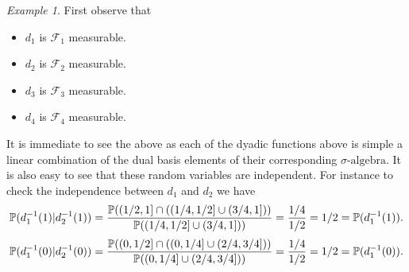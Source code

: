 \documentclass[11pt,a4paper]{article}
\theoremstyle{definition}
\theoremstyle{remark}
\newtheorem{example}{Example}
\begin{document}
\begin{example}
		First observe that
		\begin{itemize}[noitemsep]
			\item $ d_1 $ is $ \mathcal{F}_1 $ measurable.
			\item $ d_2 $ is $ \mathcal{F}_2 $ measurable.
			\item $ d_3 $ is $ \mathcal{F}_3 $ measurable.
			\item $ d_4 $ is $ \mathcal{F}_4 $ measurable.
		\end{itemize}
		It is immediate to see the above as each of the dyadic functions above is simple a linear combination of the dual basis elements of their corresponding $\sigma\text{-algebra}$. It is also easy to see that these random variables are independent. For instance to check the independence between $ d_1 $ and $ d_2 $ we have
		\[ \mathbb{P}(d_1^{-1}(1)|d_2^{-1}(1)) = \frac{\mathbb{P}((1/2,1] \cap ((1/4,1/2]\cup(3/4,1]))}{\mathbb{P}((1/4,1/2]\cup(3/4,1]))} = \frac{1/4}{1/2} = 1/2 =  \mathbb{P}(d^{-1}_1(1)). \]
		\[ \mathbb{P}(d_1^{-1}(0)|d_2^{-1}(0)) = \frac{\mathbb{P}((0,1/2] \cap ((0,1/4]\cup(2/4,3/4]))}{\mathbb{P}((0,1/4]\cup(2/4,3/4]))} = \frac{1/4}{1/2} = 1/2 =  \mathbb{P}(d^{-1}_1(0)). \]
	\end{example}
	
	
	
	
	
	
	
%	
%	
%	
	
\end{document}
